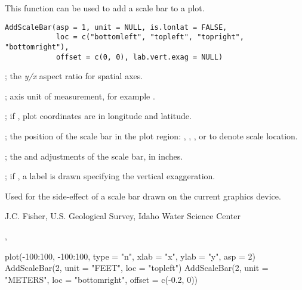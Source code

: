 \documentclass[a4paper]{book}
\begin{document}
%
\begin{Description}\relax
This function can be used to add a scale bar to a plot.
\end{Description}
%
\begin{Usage}
\begin{verbatim}
AddScaleBar(asp = 1, unit = NULL, is.lonlat = FALSE,
            loc = c("bottomleft", "topleft", "topright", "bottomright"),
            offset = c(0, 0), lab.vert.exag = NULL)
\end{verbatim}
\end{Usage}
%
\begin{Arguments}
\begin{ldescription}
\item[\code{asp}] ; the \emph{y/x} aspect ratio for spatial axes.
\item[\code{unit}] ; axis unit of measurement, for example .
\item[\code{is.lonlat}] ; if , plot coordinates are in longitude and latitude.
\item[\code{loc}] ; the position of the scale bar in the plot region: , , , or  to denote scale location.
\item[\code{offset}] ; the  and  adjustments of the scale bar, in inches.
\item[\code{lab.vert.exag}] ; if , a label is drawn specifying the vertical exaggeration.
\end{ldescription}
\end{Arguments}
%
\begin{Value}
Used for the side-effect of a scale bar drawn on the current graphics device.
\end{Value}
%
\begin{Author}\relax
J.C. Fisher, U.S. Geological Survey, Idaho Water Science Center
\end{Author}
%
\begin{SeeAlso}\relax
{}, 
\end{SeeAlso}
%
\begin{Examples}
\begin{ExampleCode}
plot(-100:100, -100:100, type = "n", xlab = "x", ylab = "y", asp = 2)
AddScaleBar(2, unit = "FEET", loc = "topleft")
AddScaleBar(2, unit = "METERS", loc = "bottomright", offset = c(-0.2, 0))
\end{ExampleCode}
\end{Examples}
\end{document}
